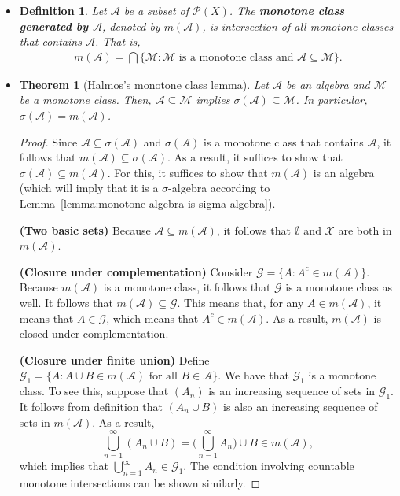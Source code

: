 \documentclass[10pt]{article}
\newtheorem{theorem}[lemma]{Theorem}
\newtheorem{definition}[lemma]{Definition}
\newcommand{\mcal}[1]{\mathcal{#1}}
\newcommand{\X}{\mathcal{X}}
\begin{document}
\begin{itemize}
  \item \begin{definition}
    Let $\mcal{A}$ be a subset of $\mcal{P}(X)$. The {\bf monotone class generated by $\mcal{A}$}, denoted by $m(\mcal{A})$, is intersection of all monotone classes that contains $\mcal{A}$. That is,
    \begin{align*}
      m(\mcal{A}) = \bigcap \{ \mcal{M} : \mcal{M}\mbox{ is a monotone class and }\mcal{A} \subseteq \mcal{M} \}.
    \end{align*}
  \end{definition}

  \item \begin{theorem}[Halmos's monotone class lemma] \label{theorem:monotone-class}
    Let $\mcal{A}$ be an algebra and $\mcal{M}$ be a monotone class. Then, $\mcal{A} \subseteq \mcal{M}$ implies $\sigma(\mcal{A}) \subseteq \mcal{M}$. In particular, $\sigma(\mcal{A}) = m(\mcal{A})$.
  \end{theorem}  
  
  \begin{proof}
    Since $\mcal{A} \subseteq \sigma(\mcal{A})$ and $\sigma(\mcal{A})$ is a monotone class that contains $\mcal{A}$, it follows that $m(\mcal{A}) \subseteq \sigma(\mcal{A})$. As a result, it suffices to show that $\sigma(\mcal{A}) \subseteq m(\mcal{A})$. For this, it suffices to show that $m(\mcal{A})$ is an algebra (which will imply that it is a $\sigma$-algebra according to Lemma~\ref{lemma:monotone-algebra-is-sigma-algebra}).

    {\bf (Two basic sets)} Because $\mcal{A} \subseteq m(\mcal{A})$, it follows that $\emptyset$ and $\X$ are both in $m(\mcal{A})$.

    {\bf (Closure under complementation)} Consider $\mcal{G} = \{ A : A^c \in m(\mcal{A}) \}$. Because $m(\mcal{A})$ is a monotone class, it follows that $\mcal{G}$ is a monotone class as well. It follows that $m(\mcal{A}) \subseteq \mcal{G}$. This means that, for any $A \in m(\mcal{A})$, it means that $A \in \mcal{G}$, which means that $A^c \in m(\mcal{A})$. As a result, $m(\mcal{A})$ is closed under complementation.

    {\bf (Closure under finite union)} Define $\mcal{G}_1 = \{ A : A \cup B \in m(\mcal{A})\mbox{ for all } B \in \mcal{A} \}$. We have that $\mcal{G}_1$ is a monotone class. To see this, suppose that $(A_n)$ is an increasing sequence of sets in $\mcal{G}_1$. It follows from definition that $(A_n \cup B)$ is also an increasing sequence of sets in $m(\mcal{A})$. As a result, $$\bigcup_{n=1}^\infty (A_n \cup B) = \Big( \bigcup_{n=1}^\infty A_n \Big) \cup B \in m(\mcal{A}),$$
    which implies that $\bigcup_{n=1}^\infty A_n \in \mcal{G}_1$. The condition involving countable monotone intersections can be shown similarly. 
    

\end{proof}
\end{itemize}
\end{document}
